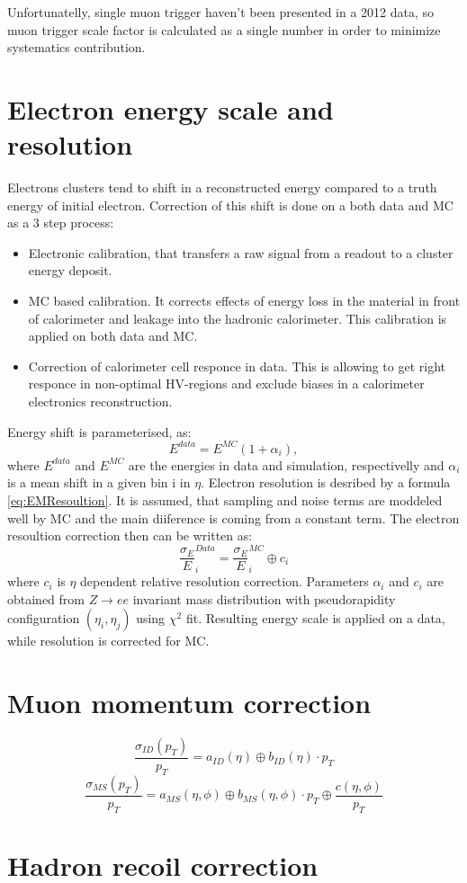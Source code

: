 Unfortunatelly, single muon trigger haven't been presented in a 2012 data, so muon trigger scale factor is calculated as a single number in order to minimize systematics contribution. 
\section{Electron energy scale and resolution}
Electrons clusters tend to shift in a reconstructed energy compared to a truth energy of initial electron. Correction of this shift is done on a both data and MC as a 3 step process:
\begin{itemize}
\item Electronic calibration, that transfers a raw signal from a readout to a cluster energy deposit.
\item MC based calibration. It corrects effects of energy loss in the material in front of calorimeter and leakage into the hadronic calorimeter. This calibration is applied on both data and MC.
\item Correction of calorimeter cell responce in data. This is allowing to get right responce in non-optimal HV-regions and exclude biases in a calorimeter electronics reconstruction.
\end{itemize}

Energy shift is parameterised, as:
\begin{equation}
E^{data}=E^{MC}(1+\alpha_i),
\end{equation}
where $E^{data}$ and $E^{MC}$ are the energies in data and simulation, respectivelly and $\alpha_i$ is a mean shift in a given bin i in $\eta$. 
Electron resolution is desribed by a formula \ref{eq:EMResoultion}. It is assumed, that sampling and noise terms are moddeled well by MC and the main diiference is coming from a constant term. 
The electron resoultion correction then can be written as:
\begin{equation}
\frac{\sigma_E}{E}^{Data}_{i}=\frac{\sigma_E}{E}^{MC}_{i} \oplus c_i
\end{equation}
where $c_i$ is $\eta$ dependent relative resolution correction. Parameters
$\alpha_i$ and $c_i$ are obtained from $Z\to ee$ invariant mass distribution with pseudorapidity configuration $(\eta_i, \eta_j)$ using $\chi^2$ fit. Resulting energy scale is applied on a data, while resolution is corrected for MC.

\section{Muon momentum correction}
\begin{equation}
\frac{\sigma_{ID}(p_T)}{p_T}=a_{ID}(\eta) \oplus b_{ID}(\eta) \cdot p_T
\end{equation}
\begin{equation}
\frac{\sigma_{MS}(p_T)}{p_T}=a_{MS}(\eta, \phi) \oplus b_{MS} (\eta, \phi) \cdot p_T \oplus \frac{c(\eta, \phi)}{p_T}
\end{equation}

\section{Hadron recoil correction}
